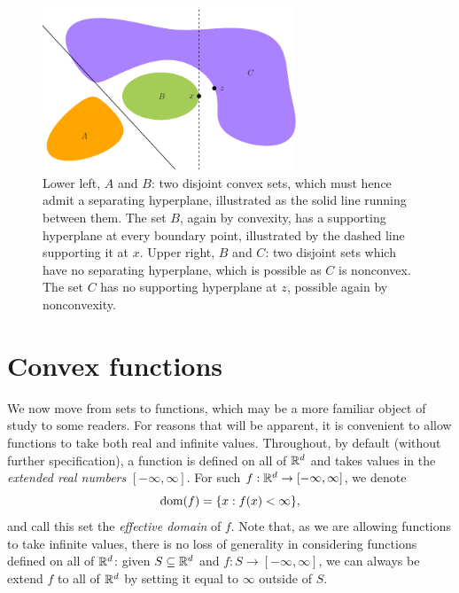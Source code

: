 \begin{figure}[tb]
\centering
\includegraphics[width=0.675\textwidth]{fig/set_theorems.pdf}
\caption{Lower left, $A$ and $B$: two disjoint convex sets, which must hence 
  admit a separating hyperplane, illustrated as the solid line running between
  them. The set $B$, again by convexity, has a supporting hyperplane at every
  boundary point, illustrated by the dashed line supporting it at $x$. Upper
  right, $B$ and $C$: two disjoint sets which have no separating hyperplane,
  which is possible as $C$ is nonconvex. The set $C$ has no supporting
  hyperplane at $z$, possible again by nonconvexity.}   
\label{fig:set_theorems}
\end{figure}

\section{Convex functions}
\label{sec:convex_functions}

We now move from sets to functions, which may be a more familiar object of study
to some readers. For reasons that will be apparent, it is convenient to allow
functions to take both real and infinite values. Throughout, by default (without
further specification), a function is defined on all of $\mathbb{R}^d$ and takes values
in the \emph{extended real numbers} $[-\infty, \infty]$. For such $f : \mathbb{R}^d \to
[-\infty, \infty]$, we denote
\[
\operatorname{dom}(f) = \{x : f(x) < \infty \},
\]
and call this set the \emph{effective domain} of $f$. Note that, as we are
allowing functions to take infinite values, there is no loss of generality in
considering functions defined on all of $\mathbb{R}^d$: given $S \subseteq \mathbb{R}^d$ and $f
: S \to [-\infty, \infty]$, we can always be extend $f$ to all of $\mathbb{R}^d$ by
setting it equal to $\infty$ outside of $S$.

